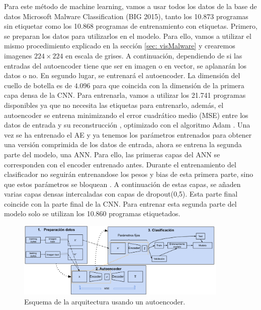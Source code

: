 Para este método de machine learning, vamos a usar todos los datos de la base de datos Microsoft Malware Classification (BIG 2015), tanto los 10.873 programas sin etiquetar como los 10.868 programas de entrenamiento con etiquetas. Primero, se preparan los datos para utilizarlos en el modelo. Para ello, vamos a utilizar el mismo procedimiento explicado en la sección \ref{sec: visMalware} y crearemos imagenes $224 \times 224$ en escala de grises. A continuación, dependiendo de si las entradas del autoencoder tiene que ser en imagen o en vector, se aplanarán los datos o no. En segundo lugar, se entrenará el autoencoder. La dimensión del cuello de botella es de $4.096$ para que coincida con la dimensión de la primera capa densa de la CNN. Para entrenarla, vamos a utilizar los 21.741 programas disponibles ya que no necesita las etiquetas para entrenarlo, además, el autoencoder se entrena minimizando el error cuadrático medio (MSE) entre los datos de entrada y su reconstrucción \citep{guo2017deep}, optimizado con el algoritmo Adam \citep{aekeras}. Una vez se ha entrenado el AE y ya tenemos los parámetros entrenados para obtener una versión comprimida de los datos de entrada, ahora se entrena la segunda parte del modelo, una ANN. Para ello, las primeras capas del ANN se corresponden con el encoder entrenado antes. Durante el entrenamiento del clasificador no seguirán entrenandose los pesos y bias de esta primera parte, sino que estos parámetros se bloquean \citep{lopes2022effective}. A continuación de estas capas, se añaden varias capas densas intercaladas con capas de dropout(0,5). Esta parte final coincide con la parte final de la CNN. Para entrenar esta segunda parte del modelo solo se utilizan los 10.860 programas etiquetados.

\begin{figure}[h]
    \begin{center}
    \includegraphics[width=0.9\textwidth]{img/aeMMCgen.png}
    \end{center}
    \caption{Esquema de la arquitectura usando un autoencoder.}
    \label{img: aeMMCgen}
\end{figure}

